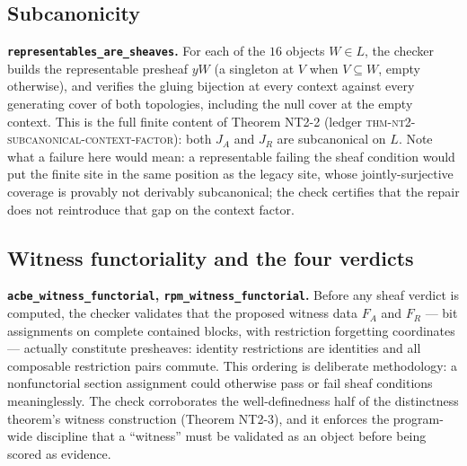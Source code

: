 \subsection{Subcanonicity}
\label{ch11:sec:subcanonicity}

\begin{checkclass}
\label{ch11:chk:representables}
\textbf{\texttt{representables\_are\_sheaves}.} For each of the $16$ objects
$W \in L$, the checker builds the representable presheaf $yW$ (a singleton
at $V$ when $V \subseteq W$, empty otherwise), and verifies the gluing
bijection at every context against every generating cover of both
topologies, including the null cover at the empty context. This is the full
finite content of Theorem NT2-2 (ledger
\textsc{thm-nt2-subcanonical-context-factor}): both $J_A$ and $J_R$ are
subcanonical on $L$. Note what a failure here would mean: a
representable failing the sheaf condition would put the finite site in the
same position as the legacy site, whose jointly-surjective coverage is
provably not derivably subcanonical; the check certifies that the repair
does not reintroduce that gap on the context factor.
\end{checkclass}

\subsection{Witness functoriality and the four verdicts}
\label{ch11:sec:witnesses}

\begin{checkclass}
\label{ch11:chk:functorial}
\textbf{\texttt{acbe\_witness\_functorial}, \texttt{rpm\_witness\_functorial}.}
Before any sheaf verdict is computed, the checker validates that the proposed
witness data $F_A$ and $F_R$ --- bit assignments on complete contained
blocks, with restriction forgetting coordinates --- actually constitute
presheaves: identity restrictions are identities and all composable
restriction pairs commute. This ordering is deliberate methodology:
a nonfunctorial section assignment could otherwise pass or fail sheaf
conditions meaninglessly. The check corroborates the well-definedness half of
the distinctness theorem's witness construction (Theorem NT2-3), and it
enforces the program-wide discipline that a ``witness'' must be validated as
an object before being scored as evidence.
\end{checkclass}


